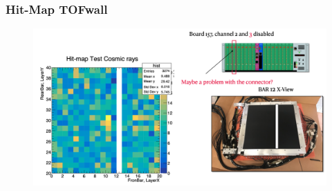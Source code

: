 \begin{frame} [fragile]
    \small
        \frametitle{Hit-Map TOFwall}
                \begin{figure}
                 \centering
                    \includegraphics[scale=0.28]{figures/hit_map.png}
                \end{figure}
    \end{frame}
